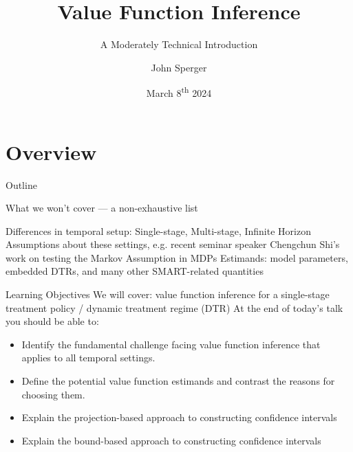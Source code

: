 \documentclass[aspectratio=169, professionalfonts]{beamer}
\author{John Sperger}
\date{March 8\textsuperscript{th} 2024}
\title{Value Function Inference}
\subtitle{A Moderately Technical Introduction}
\begin{document}
\maketitle

\section{Overview}
\begin{frame}{Outline}
	\tableofcontents[hideallsubsections]
\end{frame}

\begin{frame}[label={overview:time}]{What we won't cover --- a non-exhaustive list}

	Differences in temporal setup: Single-stage, Multi-stage, Infinite Horizon
	\vfill
	Assumptions about these settings, e.g. recent seminar speaker Chengchun
	Shi's work on testing the Markov Assumption in MDPs
	\vfill
	Estimands: model parameters, embedded DTRs, and many other SMART-related quantities

\end{frame}

\begin{frame}[label={overview:objectives}]{Learning Objectives}
	We will cover: value function inference for a single-stage treatment policy /
	dynamic treatment regime (DTR)
	\vfill \pause
	At the end of today's talk you should be able to:
	\begin{itemize}
		\item Identify the fundamental challenge facing value function inference
		      that applies to all temporal settings.
		\item Define the potential value function estimands and contrast the
		      reasons for choosing them.

		\item Explain the projection-based approach to constructing confidence intervals

		\item Explain the bound-based approach to constructing confidence intervals
	\end{itemize}
	\vfill
\end{frame}
\end{document}
